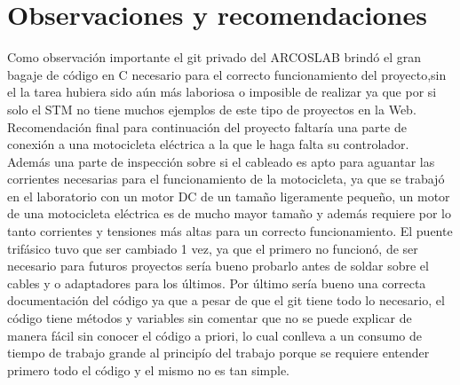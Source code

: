\documentclass[letterpaper]{article}
\begin{document}
\section{Observaciones y recomendaciones}
Como observación importante el git privado del ARCOSLAB brindó el gran bagaje de código en C necesario para el correcto funcionamiento del proyecto,sin el la tarea hubiera sido aún más laboriosa o imposible de realizar
ya que por si solo el STM no tiene muchos ejemplos de este tipo de proyectos en la Web. 
Recomendación final para continuación del proyecto faltaría una parte de conexión a una motocicleta eléctrica a la que le haga falta su controlador.
Además una parte de inspección sobre si el cableado es apto para aguantar las corrientes necesarias para el funcionamiento de la motocicleta, ya que se trabajó en el laboratorio con un motor DC de un tamaño ligeramente pequeño, un motor de una motocicleta eléctrica es de mucho mayor tamaño y además requiere por lo tanto corrientes y tensiones más altas para un correcto funcionamiento.
El puente trifásico tuvo que ser cambiado 1 vez, ya que el primero no funcionó, de ser necesario para futuros proyectos sería bueno probarlo antes de soldar sobre el cables y o adaptadores para los últimos.
Por último sería bueno una correcta documentación del código ya que a pesar de que el git tiene todo lo necesario, el código tiene métodos y variables sin comentar que no se puede explicar de manera fácil sin conocer el código a priori, lo cual
conlleva a un consumo de tiempo de trabajo grande al principío del trabajo porque se requiere entender primero todo el código y el mismo no es tan simple.


 

\end{document}
